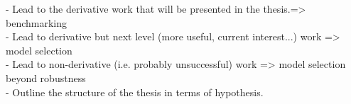 - Lead to the derivative work that will be presented in the thesis.=> benchmarking \\
- Lead to derivative but next level (more useful, current interest...) work => model selection \\
- Lead to non-derivative (i.e. probably unsuccessful) work => model selection beyond robustness \\
- Outline the structure of the thesis in terms of hypothesis. \\
